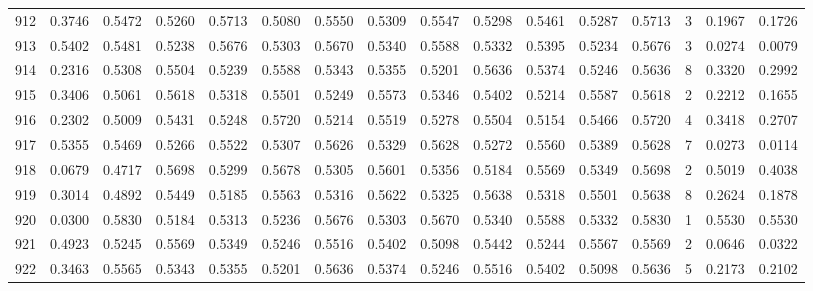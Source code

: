 \begin{tabular}{lrrrrrrrrrrrrrrr}
912 &      0.3746 &  0.5472 &  0.5260 &  0.5713 &  0.5080 &  0.5550 &  0.5309 &  0.5547 &  0.5298 &  0.5461 &   0.5287 &     0.5713 &      3 &                    0.1967 &                     0.1726 \\
913 &      0.5402 &  0.5481 &  0.5238 &  0.5676 &  0.5303 &  0.5670 &  0.5340 &  0.5588 &  0.5332 &  0.5395 &   0.5234 &     0.5676 &      3 &                    0.0274 &                     0.0079 \\
914 &      0.2316 &  0.5308 &  0.5504 &  0.5239 &  0.5588 &  0.5343 &  0.5355 &  0.5201 &  0.5636 &  0.5374 &   0.5246 &     0.5636 &      8 &                    0.3320 &                     0.2992 \\
915 &      0.3406 &  0.5061 &  0.5618 &  0.5318 &  0.5501 &  0.5249 &  0.5573 &  0.5346 &  0.5402 &  0.5214 &   0.5587 &     0.5618 &      2 &                    0.2212 &                     0.1655 \\
916 &      0.2302 &  0.5009 &  0.5431 &  0.5248 &  0.5720 &  0.5214 &  0.5519 &  0.5278 &  0.5504 &  0.5154 &   0.5466 &     0.5720 &      4 &                    0.3418 &                     0.2707 \\
917 &      0.5355 &  0.5469 &  0.5266 &  0.5522 &  0.5307 &  0.5626 &  0.5329 &  0.5628 &  0.5272 &  0.5560 &   0.5389 &     0.5628 &      7 &                    0.0273 &                     0.0114 \\
918 &      0.0679 &  0.4717 &  0.5698 &  0.5299 &  0.5678 &  0.5305 &  0.5601 &  0.5356 &  0.5184 &  0.5569 &   0.5349 &     0.5698 &      2 &                    0.5019 &                     0.4038 \\
919 &      0.3014 &  0.4892 &  0.5449 &  0.5185 &  0.5563 &  0.5316 &  0.5622 &  0.5325 &  0.5638 &  0.5318 &   0.5501 &     0.5638 &      8 &                    0.2624 &                     0.1878 \\
920 &      0.0300 &  0.5830 &  0.5184 &  0.5313 &  0.5236 &  0.5676 &  0.5303 &  0.5670 &  0.5340 &  0.5588 &   0.5332 &     0.5830 &      1 &                    0.5530 &                     0.5530 \\
921 &      0.4923 &  0.5245 &  0.5569 &  0.5349 &  0.5246 &  0.5516 &  0.5402 &  0.5098 &  0.5442 &  0.5244 &   0.5567 &     0.5569 &      2 &                    0.0646 &                     0.0322 \\
922 &      0.3463 &  0.5565 &  0.5343 &  0.5355 &  0.5201 &  0.5636 &  0.5374 &  0.5246 &  0.5516 &  0.5402 &   0.5098 &     0.5636 &      5 &                    0.2173 &                     0.2102 \\

\end{tabular}
